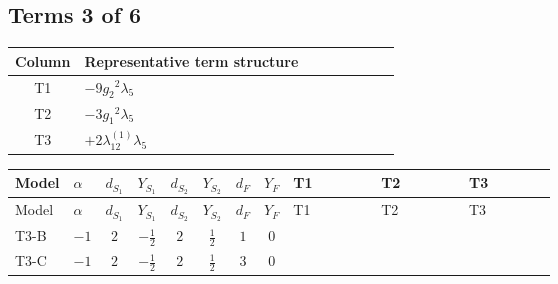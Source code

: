 \documentclass[8pt]{article}
\begin{document}
\begin{landscape}
\subsection*{Terms 3 of 6}
\begin{center}
\begin{tabular}{@{}c >{\raggedright\arraybackslash}p{0.82\linewidth}@{}}
\toprule
Column & Representative term structure \\
\midrule
T1 & \(\displaystyle -9 {g_2}^2 {\lambda_5}\) \\
\midrule
T2 & \(\displaystyle -3 {g_1}^2 {\lambda_5}\) \\
\midrule
T3 & \(\displaystyle +2 {\lambda_{12}^{(1)}} {\lambda_5}\) \\
\midrule
\bottomrule
\end{tabular}
\end{center}
\smallskip
\tiny
\begin{longtable}{@{}llcccccc >{\raggedright\arraybackslash}p{0.21\linewidth} >{\raggedright\arraybackslash}p{0.21\linewidth} >{\raggedright\arraybackslash}p{0.21\linewidth}@{}}
\toprule
Model & $\alpha$ & $d_{S_1}$ & $Y_{S_1}$ & $d_{S_2}$ & $Y_{S_2}$ & $d_F$ & $Y_F$ & T1 & T2 & T3 \\
\midrule
\endfirsthead
\toprule
Model & $\alpha$ & $d_{S_1}$ & $Y_{S_1}$ & $d_{S_2}$ & $Y_{S_2}$ & $d_F$ & $Y_F$ & T1 & T2 & T3 \\
\midrule
\endhead
T3-B & $-1$ & $2$ & $-\frac{1}{2}$ & $2$ & $\frac{1}{2}$ & $1$ & $0$ & \scriptsize\adjustbox{max width=\linewidth}{$\begin{gathered} -9 {g_2}^2 {\lambda_5}\end{gathered}$} & \scriptsize\adjustbox{max width=\linewidth}{$\begin{gathered} -3 {g_1}^2 {\lambda_5}\end{gathered}$} & \scriptsize\adjustbox{max width=\linewidth}{$\begin{gathered} +2 {\lambda_{12}^{(1)}} {\lambda_5}\end{gathered}$} \\
\midrule
T3-C & $-1$ & $2$ & $-\frac{1}{2}$ & $2$ & $\frac{1}{2}$ & $3$ & $0$ & \scriptsize\adjustbox{max width=\linewidth}{$\begin{gathered} -9 {g_2}^2 {\lambda_5}\end{gathered}$} & \scriptsize\adjustbox{max width=\linewidth}{$\begin{gathered} -3 {g_1}^2 {\lambda_5}\end{gathered}$} & \scriptsize\adjustbox{max width=\linewidth}{$\begin{gathered} +2 {\lambda_{12}^{(1)}} {\lambda_5}\end{gathered}$} \\

\end{longtable}
\end{landscape}
\end{document}
